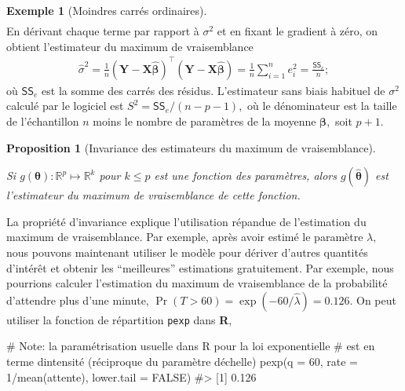 \documentclass[
  11pt,
  letterpaper,
]{scrbook}
\newenvironment{Shaded}{\begin{snugshade}}{\end{snugshade}}
\newcommand{\AttributeTok}[1]{\textcolor[rgb]{0.40,0.45,0.13}{#1}}
\newcommand{\CommentTok}[1]{\textcolor[rgb]{0.37,0.37,0.37}{#1}}
\newcommand{\ConstantTok}[1]{\textcolor[rgb]{0.56,0.35,0.01}{#1}}
\newcommand{\DecValTok}[1]{\textcolor[rgb]{0.68,0.00,0.00}{#1}}
\newcommand{\FunctionTok}[1]{\textcolor[rgb]{0.28,0.35,0.67}{#1}}
\newcommand{\NormalTok}[1]{\textcolor[rgb]{0.00,0.23,0.31}{#1}}
\newcommand{\SpecialCharTok}[1]{\textcolor[rgb]{0.37,0.37,0.37}{#1}}
\theoremstyle{plain}
\newtheorem{proposition}{Proposition}[chapter]
\theoremstyle{plain}
\theoremstyle{definition}
\newtheorem{example}{Exemple}[chapter]
\theoremstyle{definition}
\theoremstyle{remark}
\begin{document}
\begin{example}[Moindres carrés
ordinaires]
\begin{align*}
\end{align*} En dérivant chaque terme par rapport à \(\sigma^2\) et en
fixant le gradient à zéro, on obtient l'estimateur du maximum de
vraisemblance \begin{align*}
\widehat{\sigma}^2=\frac{1}{n}(\boldsymbol{Y}-\mathbf{X}\hat{\boldsymbol{\beta}})^\top(\boldsymbol{Y}-\mathbf{X}\hat{\boldsymbol{\beta}})= \frac{1}{n} \sum_{i=1}^n e_i^2= \frac{\mathsf{SS}_e}{n};
\end{align*} où \(\mathsf{SS}_e\) est la somme des carrés des résidus.
L'estimateur sans biais habituel de \(\sigma^2\) calculé par le logiciel
est \(S^2=\mathsf{SS}_e/(n-p-1),\) où le dénominateur est la taille de
l'échantillon \(n\) moins le nombre de paramètres de la moyenne
\(\boldsymbol{\beta},\) soit \(p+1.\)

\end{example}

\begin{proposition}[Invariance des estimateurs du maximum de
vraisemblance]\protect\hypertarget{prp-invariance-emv}{}\label{prp-invariance-emv}

Si \(g(\boldsymbol{\theta}): \mathbb{R}^p \mapsto \mathbb{R}^k\) pour
\(k \leq p\) est une fonction des paramètres, alors
\(g(\widehat{\boldsymbol{\theta}})\) est l'estimateur du maximum de
vraisemblance de cette fonction.

\end{proposition}

La propriété d'invariance explique l'utilisation répandue de
l'estimation du maximum de vraisemblance. Par exemple, après avoir
estimé le paramètre \(\lambda,\) nous pouvons maintenant utiliser le
modèle pour dériver d'autres quantités d'intérêt et obtenir les
``meilleures'' estimations gratuitement. Par exemple, nous pourrions
calculer l'estimation du maximum de vraisemblance de la probabilité
d'attendre plus d'une minute,
\(\Pr(T>60) = \exp(-60/\widehat{\lambda})= 0.126.\) On peut utiliser la
fonction de répartition \texttt{pexp} dans \textbf{R},

\begin{Shaded}
\begin{Highlighting}[]
\CommentTok{\# Note: la paramétrisation usuelle dans R pour la loi exponentielle}
\CommentTok{\# est en terme d\textquotesingle{}intensité (réciproque du paramètre d\textquotesingle{}échelle)}
\FunctionTok{pexp}\NormalTok{(}\AttributeTok{q =} \DecValTok{60}\NormalTok{, }\AttributeTok{rate =} \DecValTok{1}\SpecialCharTok{/}\FunctionTok{mean}\NormalTok{(attente), }\AttributeTok{lower.tail =} \ConstantTok{FALSE}\NormalTok{)}
\CommentTok{\#\textgreater{} [1] 0.126}
\end{Highlighting}
\end{Shaded}
\end{document}
